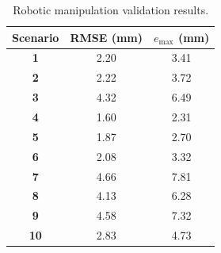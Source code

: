 \documentclass{pas}
\begin{document}
\begin{table}[t]
    \centering
    \caption{Robotic manipulation validation results.}
    \label{tab:robotic_validation}
    \noindent
    \begin{tabular}{|c|c|c|}
        \hline
        \hfil \textbf{Scenario}\hfil & \hfil \textbf{RMSE (mm)}\hfil & \hfil \textbf{\(e_{\max}\) (mm)}\hfil \\
        \hline
         \textbf{1}  &  2.20 &  3.41 \\ \hline
         \textbf{2}  &  2.22 &  3.72 \\ \hline
         \textbf{3}  &  4.32 &  6.49 \\ \hline
         \textbf{4}  &  1.60 &  2.31 \\ \hline
         \textbf{5}  &  1.87 &  2.70 \\ \hline
         \textbf{6}  &  2.08 &  3.32 \\ \hline
         \textbf{7}  &  4.66 &  7.81 \\ \hline
         \textbf{8}  &  4.13 &  6.28 \\ \hline
         \textbf{9}  &  4.58 &  7.32 \\ \hline
         \textbf{10} &  2.83 &  4.73 \\ \hline
    \end{tabular}
\end{table}




\end{document}

